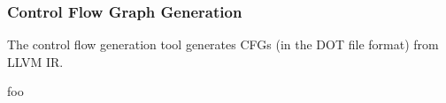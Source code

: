 
\subsubsection{Control Flow Graph Generation}
\label{sec:design_control_flow_graph_generation}


The control flow generation tool generates CFGs (in the DOT file format) from LLVM IR.

foo
